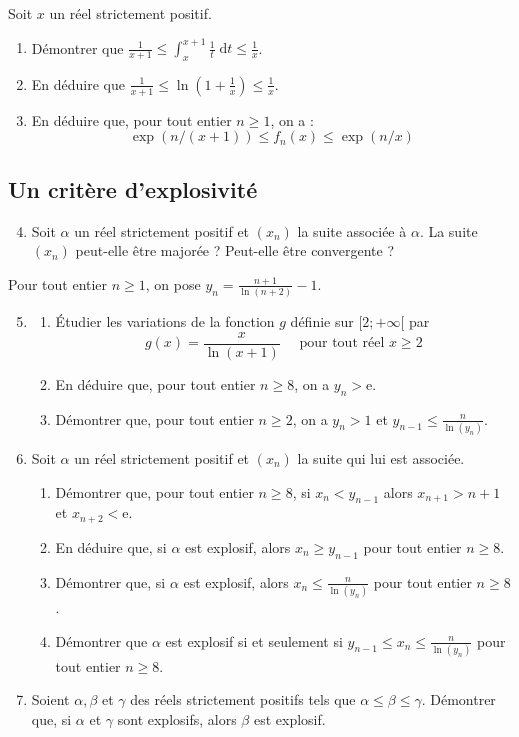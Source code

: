 \documentclass[landscape,twocolumn,leqno,a4paper,10pt]{report} %
\newcommand\n{\noindent}
\newcommand\q{\quad}
\renewcommand{\geq}{\geqslant}
\renewcommand{\leq}{\leqslant}
\newcommand{\e}{\mathrm{e}}
\renewcommand{\d}{\;\mathrm{d}}	%
\newcommand{\Int}[4]{{\displaystyle\int_{#1}^{#2} #3  \d #4}}   					%
\begin{document}
\n Soit $x$ un réel strictement positif.

\begin{enumerate}
	\item Démontrer que $\frac{1}{x+1} \leq \Int{x}{x+1}{\frac{1}{t}}{t}\leq \frac{1}{x}$.
	\item En déduire que $\frac{1}{x+1} \leq \ln \left(1+\frac{1}{x}\right) \leq \frac{1}{x}$.
	\item En déduire que, pour tout entier $n \geq 1$, on a :
	$$\exp (n /(x+1)) \leq f_{n}(x) \leq \exp (n / x)$$
\end{enumerate}


\subsection{Un critère d'explosivité}

\begin{enumerate}\setcounter{enumi}{3}
	\item Soit $\alpha$ un réel strictement positif et $\left(x_{n}\right)$ la suite associée à $\alpha$. La suite $\left(x_{n}\right)$ peut-elle être majorée ? Peut-elle être convergente ?
\end{enumerate}

\n Pour tout entier $n \geq 1$, on pose $y_{n}=\frac{n+1}{\ln (n+2)}-1$.

\begin{enumerate}\setcounter{enumi}{4}
	\item \begin{enumerate}
		\item Étudier les variations de la fonction $g$ définie sur $[2 ;+\infty[$ par
		$$g(x)=\frac{x}{\ln (x+1)} \q\text { pour tout réel } x \geq 2$$
		\item En déduire que, pour tout entier $n \geq 8$, on a $y_{n}>\e$.
		\item Démontrer que, pour tout entier $n \geq 2$, on a $y_{n}>1$ et $y_{n-1} \leq \frac{n}{\ln \left(y_{n}\right)}$.
	\end{enumerate}	 
	\item Soit $\alpha$ un réel strictement positif et $\left(x_{n}\right)$ la suite qui lui est associée.
	\begin{enumerate}
		\item Démontrer que, pour tout entier $n \geq 8$, si $x_{n}<y_{n-1}$ alors $x_{n+1}>n+1$ et $x_{n+2}<\e$.
		\item En déduire que, si $\alpha$ est explosif, alors $x_{n} \geq y_{n-1}$ pour tout entier $n \geq 8$. 
		\item Démontrer que, si $\alpha$ est explosif, alors $x_{n} \leq \frac{n}{\ln \left(y_{n}\right)}$ pour tout entier $n \geq 8$.
		\item Démontrer que $\alpha$ est explosif si et seulement si $y_{n-1} \leq x_{n} \leq \frac{n}{\ln \left(y_{n}\right)}$ pour tout entier $n \geq 8$.
	\end{enumerate}
	\item Soient $\alpha, \beta$ et $\gamma$ des réels strictement positifs tels que $\alpha \leq \beta \leq \gamma$. Démontrer que, si $\alpha$ et $\gamma$ sont explosifs, alors $\beta$ est explosif.
\end{enumerate}
\end{document}
